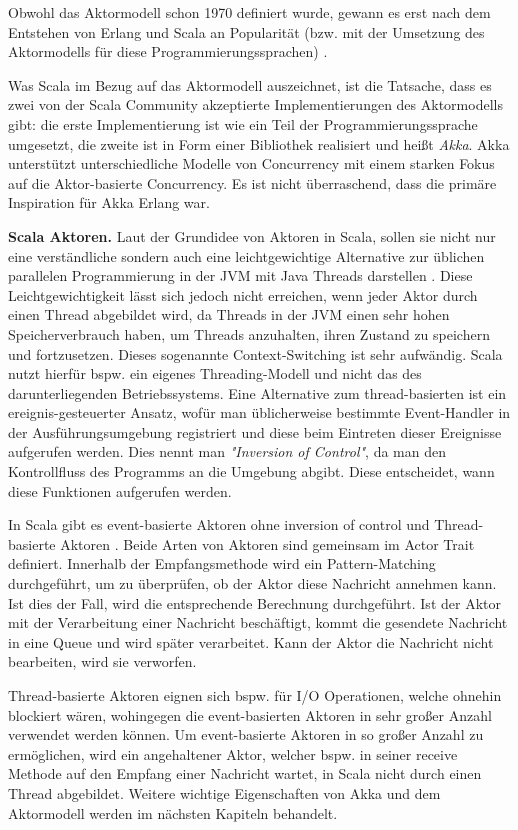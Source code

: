 Obwohl das Aktormodell schon 1970 definiert wurde, gewann es erst nach dem Entstehen von Erlang und Scala an Popularität (bzw. mit der Umsetzung des Aktormodells für diese Programmierungssprachen) \cite{Odersky04anoverview}.

Was Scala im Bezug auf das Aktormodell auszeichnet, ist die Tatsache, dass es zwei von der Scala Community akzeptierte Implementierungen des Aktormodells gibt: die erste Implementierung ist wie ein Teil der Programmierungssprache umgesetzt, die zweite ist in Form einer Bibliothek realisiert und heißt \textit{Akka}. Akka unterstützt unterschiedliche Modelle von Concurrency mit einem starken Fokus auf die Aktor-basierte Concurrency. Es ist nicht überraschend, dass die primäre Inspiration für Akka Erlang war.


\textbf{Scala Aktoren.} Laut der Grundidee von Aktoren in Scala, sollen sie nicht nur eine verständliche sondern auch eine leichtgewichtige Alternative zur üblichen parallelen Programmierung in der JVM mit Java Threads darstellen \cite{Odersky04anoverview}. Diese Leichtgewichtigkeit lässt sich jedoch nicht erreichen, wenn jeder Aktor durch einen Thread abgebildet wird, da Threads in der JVM einen sehr hohen Speicherverbrauch haben, um Threads anzuhalten, ihren Zustand zu speichern und fortzusetzen. Dieses sogenannte Context-Switching ist sehr aufwändig. Scala nutzt hierfür bspw. ein eigenes Threading-Modell und nicht das des darunterliegenden Betriebssystems. Eine Alternative zum thread-basierten ist ein ereignis-gesteuerter Ansatz, wofür man üblicherweise bestimmte Event-Handler in der Ausführungsumgebung registriert und diese beim Eintreten dieser Ereignisse aufgerufen werden. Dies nennt man \textit{"Inversion of Control"}, da man den Kontrollfluss des Programms an die Umgebung abgibt. Diese entscheidet, wann diese Funktionen aufgerufen werden.

In Scala gibt es event-basierte Aktoren ohne inversion of control und Thread-basierte Aktoren \cite{Odersky09scalaactors}. Beide Arten von Aktoren sind gemeinsam im Actor Trait definiert. Innerhalb der Empfangsmethode wird ein Pattern-Matching durchgeführt, um zu überprüfen, ob der Aktor diese Nachricht annehmen kann. Ist dies der Fall, wird die entsprechende Berechnung durchgeführt. Ist der Aktor mit der Verarbeitung einer Nachricht beschäftigt, kommt die gesendete Nachricht in eine Queue und wird später verarbeitet. Kann der Aktor die Nachricht nicht bearbeiten, wird sie verworfen.

Thread-basierte Aktoren eignen sich bspw. für I/O Operationen, welche ohnehin blockiert wären, wohingegen die event-basierten Aktoren in sehr großer Anzahl verwendet werden können. Um event-basierte Aktoren in so großer Anzahl zu ermöglichen, wird ein angehaltener Aktor, welcher bspw. in seiner receive Methode auf den Empfang einer Nachricht wartet, in Scala nicht durch einen Thread abgebildet. Weitere wichtige Eigenschaften von Akka und dem Aktormodell werden im nächsten Kapiteln behandelt.

